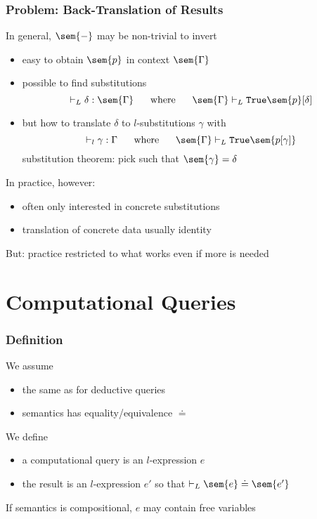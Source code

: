 \begin{frame}\frametitle{Problem: Back-Translation of Results}
In general, $\sem{-}$ may be non-trivial to invert
\begin{itemize}
\item easy to obtain $\sem{p}$ in context $\sem{\Gamma}$
\item possible to find substitutions
\[\vdash_L \delta:\sem{\Gamma} \tb\mwhere\tb \sem{\Gamma}\vdash_L \truelift \sem{p}[\delta]\]
\item but how to translate $\delta$ to $l$-substitutions $\gamma$ with
 \[\vdash_l \gamma:\Gamma \tb\mwhere\tb \sem{\Gamma}\vdash_L \truelift \sem{p[\gamma]}\]
 substitution theorem: pick such that $\sem{\gamma}=\delta$
\end{itemize}

In practice, however:
\begin{itemize}
\item often only interested in concrete substitutions
\item translation of concrete data usually identity
\end{itemize}
But: practice restricted to what works even if more is needed
\end{frame}


\section{Computational Queries}

\begin{frame}\frametitle{Definition}
We assume
\begin{itemize}
\item the same as for deductive queries
\item semantics has equality/equivalence $\doteq$
\end{itemize}

We define
\begin{itemize}
\item a computational query is an $l$-expression $e$
\item the result is an $l$-expression $e'$ so that $\vdash_L\sem{e}\doteq\sem{e'}$
\end{itemize}

If semantics is compositional, $e$ may contain free variables
\end{frame}

